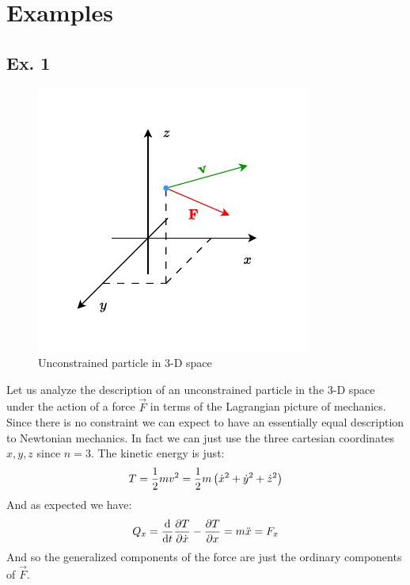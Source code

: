 \section{Examples}
\subsection{\textbf{Ex. 1}}
\begin{figure}[H]
    \centering
    \includegraphics[width=0.5\linewidth]{res/svg/unconstrained_3D_particle.drawio}
    \caption{Unconstrained particle in 3-D space}
\end{figure}
Let us analyze the description of an unconstrained particle in the 3-D space under the action of a force $\vec{F}$ in terms of the Lagrangian picture of mechanics. Since there is no constraint we can expect to have an essentially equal description to Newtonian mechanics. In fact we can just use the three cartesian coordinates $x,y,z$ since $n = 3$. The kinetic energy is just:
\begin{equation}
  T = \dfrac{1}{2}mv^2 = \dfrac{1}{2}m\left(\dot{x}^2 + \dot{y}^2 + \dot{z}^2\right)
\end{equation}
And as expected we have:
\begin{equation}
  Q_x = \dv{}{t}\pdv{T}{\dot{x}} -\pdv{T}{x}= m\ddot{x} = F_x
\end{equation}
And so the generalized components of the force are just the ordinary components of $\vec{F}$.
